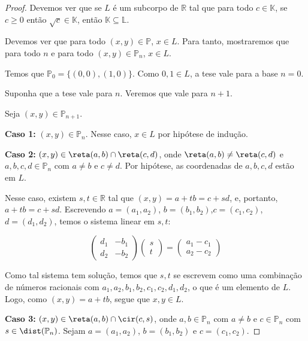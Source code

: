 \begin{proof}
    Devemos ver que se $L$ é um subcorpo de $\mathbb R$ tal que para todo $c \in \mathbb K$, se $c\geq 0$ então $\sqrt c \in \mathbb K$, então $\mathbb K\subseteq \mathbb L$.

    Devemos ver que para todo $(x, y)\in \mathbb P$, $x \in L$. Para tanto, mostraremos que para todo $n$ e para todo $(x, y)\in \mathbb P_n$, $x \in L$.

    Temos que $\mathbb P_0=\{(0, 0), (1, 0)\}$. Como $0, 1 \in L$, a tese vale para a base $n=0$.

    Suponha que a tese vale para $n$. Veremos que vale para $n+1$.

    Seja $(x, y) \in \mathbb P_{n+1}$.

    \textbf{Caso 1:} $(x, y)\in \mathbb P_n$. Nesse caso, $x \in L$ por hipótese de indução.

    \textbf{Caso 2:} $(x, y)\in \reta(a, b)\cap \reta(c, d)$, onde $\reta(a, b)\neq \reta(c, d)$ e $a, b, c, d \in \mathbb P_n$ com $a\neq b$ e $c\neq d$. Por hipótese, as coordenadas de $a, b, c, d$ estão em $L$.

    Nesse caso, existem $s, t \in \mathbb R$ tal que $(x, y)=a+tb=c+sd$, e, portanto, $a+tb=c+sd$. Escrevendo $a=(a_1, a_2)$, $b=(b_1, b_2)$,$c=(c_1, c_2)$,$d=(d_1, d_2)$, temos o sistema linear em $s, t$:

    \begin{equation*}
        \begin{pmatrix}
            d_1 & -b_1\\d_2 & -b_2
        \end{pmatrix}
        \begin{pmatrix}
            s\\t
        \end{pmatrix}
        = 
        \begin{pmatrix}
            a_1-c_1\\a_2-c_2
        \end{pmatrix}
    \end{equation*}

    Como tal sistema tem solução, temos que $s, t$ se escrevem como uma combinação de números racionais com $a_1, a_2, b_1, b_2, c_1, c_2, d_1, d_2$, o que é um elemento de $L$. Logo, como $(x, y)=a+tb$, segue que $x, y \in L$.

    \textbf{Caso 3:} $(x, y)\in \reta(a, b)\cap \cir(c, s)$, onde $a, b \in \mathbb P_n$ com $a\neq b$ e $c \in \mathbb P_n$ com $s \in \dist(\mathbb P_n)$. Sejam $a=(a_1, a_2)$, $b=(b_1, b_2)$ e $c=(c_1, c_2)$.


\end{proof}
